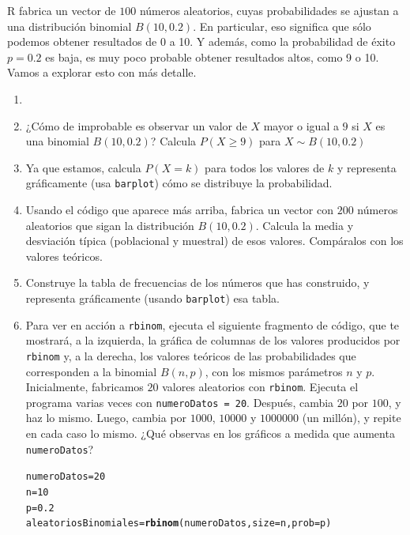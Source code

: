\documentclass[10pt,a4paper]{article}\usepackage[]{graphicx}\usepackage[]{color}
\makeatletter
\newcommand{\hlnum}[1]{\textcolor[rgb]{0.686,0.059,0.569}{#1}}%
\newcommand{\hlstd}[1]{\textcolor[rgb]{0.345,0.345,0.345}{#1}}%
\newcommand{\hlkwb}[1]{\textcolor[rgb]{0.69,0.353,0.396}{#1}}%
\newcommand{\hlkwc}[1]{\textcolor[rgb]{0.333,0.667,0.333}{#1}}%
\newcommand{\hlkwd}[1]{\textcolor[rgb]{0.737,0.353,0.396}{\textbf{#1}}}%
\newenvironment{kframe}{%
 \def\at@end@of@kframe{}%
 \ifinner\ifhmode%
  \def\at@end@of@kframe{\end{minipage}}%
  \begin{minipage}{\columnwidth}%
 \fi\fi%
 \def\FrameCommand##1{\hskip\@totalleftmargin \hskip-\fboxsep
 \colorbox{shadecolor}{##1}\hskip-\fboxsep
     \hskip-\linewidth \hskip-\@totalleftmargin \hskip\columnwidth}%
 \MakeFramed {\advance\hsize-\width
   \@totalleftmargin\z@ \linewidth\hsize
   \@setminipage}}%
 {\par\unskip\endMakeFramed%
 \at@end@of@kframe}
\newenvironment{knitrout}{}{} %
\makeatother
\begin{document}
R fabrica un vector de $100$ números aleatorios, cuyas probabilidades se ajustan a una distribución binomial $B(10,0.2)$. En particular, eso significa que sólo podemos obtener resultados de 0 a 10. Y además, como la probabilidad de éxito $p=0.2$ es baja, es muy poco probable obtener resultados altos, como 9 o 10. Vamos a explorar esto con más detalle.

\begin{ejercicio}
\label{tut05:ejercicio06}
\begin{enumerate}
  \item[]
  \item ¿Cómo de improbable es observar un valor de $X$ mayor o igual a $9$ si $X$ es una binomial $B(10, 0.2)$? Calcula $P(X\geq 9)$ para $X\sim B(10,0.2)$
  \item Ya que estamos, calcula $P(X=k)$ para todos los valores de $k$ y representa gráficamente (usa {\tt barplot}) cómo se distribuye la probabilidad.
  \item Usando el código que aparece más arriba, fabrica un vector con $200$ números aleatorios que sigan la distribución $B(10, 0.2)$. Calcula la media y desviación típica (poblacional y muestral) de esos valores. Compáralos con los valores teóricos.
  \item Construye la tabla de frecuencias de los números que has construido, y representa gráficamente (usando {\tt barplot}) esa tabla.
  \item Para ver en acción a {\tt rbinom}, ejecuta el siguiente fragmento de código, que   te mostrará, a la izquierda, la gráfica de columnas de los valores producidos por {\tt rbinom} y, a la derecha, los valores teóricos de las probabilidades que corresponden a la binomial $B(n,p)$, con los mismos  parámetros $n$ y $p$. Inicialmente, fabricamos $20$ valores aleatorios con {\tt rbinom}. Ejecuta el programa  varias veces con {\tt numeroDatos = 20}. Después, cambia $20$ por $100$, y haz lo mismo. Luego, cambia por $1000$, $10000$ y $1000000$ (un millón), y repite en cada caso lo mismo. ¿Qué observas en los gráficos a medida que aumenta {\tt numeroDatos}?
\begin{knitrout}
\color{fgcolor}\begin{kframe}
\begin{alltt}
\hlstd{numeroDatos} \hlkwb{=} \hlnum{20}
\hlstd{n} \hlkwb{=} \hlnum{10}
\hlstd{p} \hlkwb{=} \hlnum{0.2}
\hlstd{aleatoriosBinomiales} \hlkwb{=} \hlkwd{rbinom}\hlstd{(numeroDatos,} \hlkwc{size}\hlstd{=n,} \hlkwc{prob}\hlstd{=p)}


\end{alltt}
\end{kframe}
\end{knitrout}
\end{enumerate}
\end{ejercicio}
\end{document}
